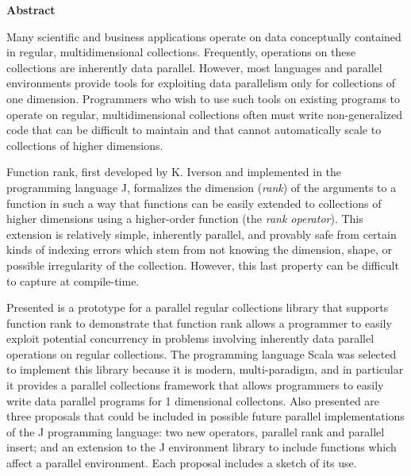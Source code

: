 \begin{center}

\bigskip

\begin{Large}
\textbf{\theTitle}
\end{Large}

\bigskip

\begin{large}
\theAuthor
\end{large}

\bigskip
\bigskip

\textbf{Abstract}

\end{center}

\noindent
Many scientific and business applications operate on 
data conceptually contained in regular, multidimensional collections.
Frequently, operations on these collections are inherently data parallel.
However, most languages and parallel environments 
provide tools for exploiting data parallelism only for collections of one dimension.
Programmers who wish to use such tools on existing programs to operate on regular, multidimensional collections
often must write non-generalized code that can be difficult to maintain and 
that cannot automatically scale to collections of higher dimensions.

Function rank, first developed by K. Iverson and implemented in the programming language J, 
formalizes the dimension (\textit{rank}) of the arguments to a function in such a way 
that functions can be easily extended to collections of higher dimensions using 
a higher-order function (the \textit{rank operator}).
This extension is relatively simple, inherently parallel, and provably safe 
from certain kinds of indexing errors which stem from not knowing the dimension, shape, or possible irregularity of the collection.
However, this last property can be difficult to capture at compile-time.

Presented is a prototype for a parallel regular collections library that supports function rank 
to demonstrate that function rank allows a programmer to easily exploit potential concurrency 
in problems involving inherently data parallel operations on regular collections.
The programming language Scala was selected to implement this library because it is modern, multi-paradigm, 
and in particular it provides a parallel collections framework that 
allows programmers to easily write data parallel programs for 1 dimensional collectons.
Also presented are three proposals that could be included in 
possible future parallel implementations of the J programming language:
two new operators, parallel rank and parallel insert;
and an extension to the J environment library to include functions which affect a parallel environment.
Each proposal includes a sketch of its use.

